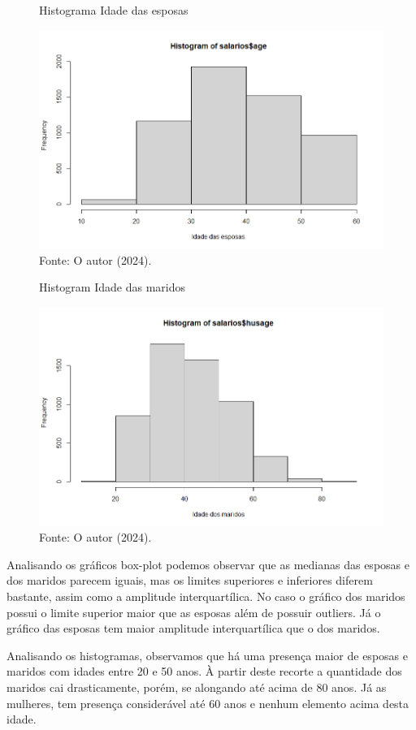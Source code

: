 \begin{figure}[H]
\centering
\caption{Histograma Idade das esposas}
\includegraphics[width=1\linewidth]{apendices/fig/4_IAA004_3.png}
\caption*{Fonte: O autor (2024).}
\end{figure}
\begin{figure}[H]
\centering
\caption{Histogram Idade das maridos}
\includegraphics[width=1\linewidth]{apendices/fig/4_IAA004_4.png}
\caption*{Fonte: O autor (2024).}
\end{figure}

Analisando os gráficos box-plot podemos observar que as medianas das esposas e dos maridos parecem iguais, mas os limites superiores e inferiores diferem bastante, assim como a amplitude interquartílica. No caso o gráfico dos maridos possui o limite superior maior que as esposas além de possuir outliers. Já o gráfico das esposas tem maior amplitude interquartílica que o dos maridos.

Analisando os histogramas, observamos que há uma presença maior de esposas e maridos com idades entre 20 e 50 anos. À partir deste recorte a quantidade dos maridos cai drasticamente, porém, se alongando até acima de 80 anos. Já as mulheres, tem presença considerável até 60 anos e nenhum elemento acima desta idade. 

